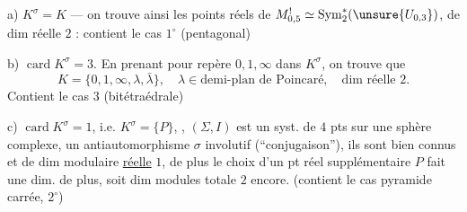 a) \(K^\sigma=K\) --- on trouve ainsi les points réels de \(M_{0,5}^{!}\simeq\mathrm{Sym}_2^*(\unsure{U_{0,3}})\),
 de dim réelle \(2\) : contient le cas \(1^\circ\) (pentagonal)

b) \(\operatorname{card}K^\sigma=3\). En prenant pour repère \(0,1,\infty\) dans \(K^\sigma\), on trouve que
\[
K=\{0,1,\infty,\lambda,\bar\lambda\},\quad
\lambda\in\text{demi-plan de Poincaré},\quad\text{dim réelle }2.
\]
Contient le cas \(3\) (bitétraédrale)

c) \(\operatorname{card}K^\sigma=1\), i.e.  \(K^\sigma=\{P\}\), , 
\((\Sigma,I)\) est un syst. de \(4\) pts sur une sphère complexe,   un antiautomorphisme \(\sigma\) involutif (``conjugaison''), ils sont bien connus et de dim modulaire \uline{réelle} \(1\), de plus le choix d’un pt réel supplémentaire \(P\) fait une dim. de plus, soit dim modules totale \(2\) encore.
(contient le cas pyramide carrée, \(2^\circ\))


